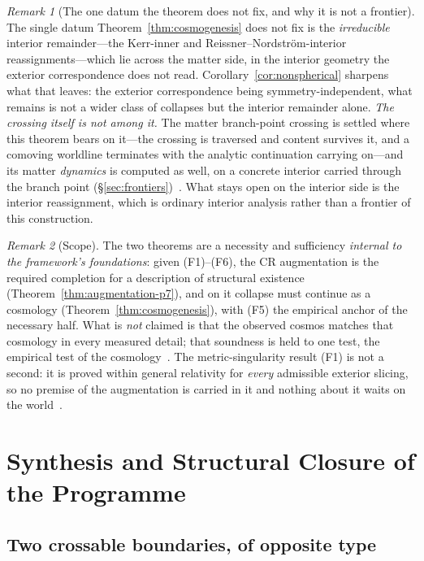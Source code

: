 \documentclass[11pt,a4paper]{article}
\theoremstyle{plain}
\theoremstyle{definition}
\theoremstyle{remark}
\newtheorem{remark}{Remark}
\begin{document}
\begin{remark}[The one datum the theorem does not fix, and why it is not a frontier]
The single datum Theorem~\ref{thm:cosmogenesis} does not fix is the \emph{irreducible} interior remainder---the Kerr-inner and Reissner--Nordstr\"om-interior reassignments---which lie across the matter side, in the interior geometry the exterior correspondence does not read. Corollary~\ref{cor:nonspherical} sharpens what that leaves: the exterior correspondence being symmetry-independent, what remains is not a wider class of collapses but the interior remainder alone. \emph{The crossing itself is not among it.} The matter branch-point crossing is settled where this theorem bears on it---the crossing is traversed and content survives it, and a comoving worldline terminates with the analytic continuation carrying on---and its matter \emph{dynamics} is computed as well, on a concrete interior carried through the branch point (\S\ref{sec:frontiers})~\cite{JanzenCosmogenesis}. What stays open on the interior side is the interior reassignment, which is ordinary interior analysis rather than a frontier of this construction.
\end{remark}

\begin{remark}[Scope]
The two theorems are a necessity and sufficiency \emph{internal to the framework's foundations}: given (F1)--(F6), the CR augmentation is the required completion for a description of structural existence (Theorem~\ref{thm:augmentation-p7}), and on it collapse must continue as a cosmology (Theorem~\ref{thm:cosmogenesis}), with (F5) the empirical anchor of the necessary half. What is \emph{not} claimed is that the observed cosmos matches that cosmology in every measured detail; that soundness is held to one test, the empirical test of the cosmology~\cite{JanzenCRcosmology}. The metric-singularity result (F1) is not a second: it is proved within general relativity for \emph{every} admissible exterior slicing, so no premise of the augmentation is carried in it and nothing about it waits on the world~\cite{JanzenBHcausality}.
\end{remark}

\section{Synthesis and Structural Closure of the Programme}\label{sec:synthesis}

\subsection{Two crossable boundaries, of opposite type}\label{sec:two-boundaries}
\end{document}

